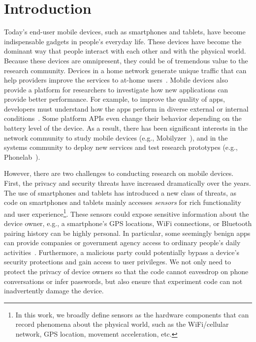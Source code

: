 \section{Introduction}

Today's end-user mobile devices, such as smartphones and
tablets, have become indispensable gadgets in people's everyday
life. These devices have become the dominant way that 
people interact with each other and with the physical world. Because 
these devices are omnipresent, they could be of tremendous value to 
the research community. Devices in a home network generate 
unique traffic that can help providers improve the services to at-home 
users~\cite{sundaresan2011broadband}.
Mobile devices also provide a platform for researchers to
investigate how new applications can provide better performance.
For example, to improve the quality of apps, developers must 
understand how the apps perform in diverse external or internal
conditions~\cite{ravindranath2012appinsight}. Some platform
APIs even change their behavior depending on the battery level
of the device.
As a result, there has been significant interests in the network
community to study mobile devices
(e.g., Mobilyzer~\cite{nikravesh2015mobilyzer}), and in the
systems community to deploy new services and test research
prototypes (e.g., Phonelab~\cite{phonelab, nandugudi2013phonelab}).  
					
However, there are two challenges to conducting research
on mobile devices. First, the privacy and security threats
have increased dramatically over the years. The use of 
smartphones and tablets has introduced a new class of threats, 
as code on smartphones and tablets mainly accesses
\textit{sensors} for rich functionality and user experience\footnote{\scriptsize In 
this work, we broadly define sensors as the hardware components 
that can record phenomena about the physical world, such as the 
WiFi/cellular network, GPS location, movement acceleration, etc.}. 
These sensors could expose sensitive information about the device 
owner, e.g., a smartphone's GPS locations,
WiFi connections, or Bluetooth pairing history can be highly
personal. In particular, some seemingly benign apps can provide 
companies or government agency access to ordinary 
people's daily activities~\cite{AngryBirds}. Furthermore, 
a malicious party could potentially bypass a
device's security protections and gain access to user
privileges. We not only need to  protect the privacy
of device owners so that the code cannot eavesdrop on phone
conversations or infer passwords, but also ensure that 
experiment code can not inadvertently damage  
the device.

